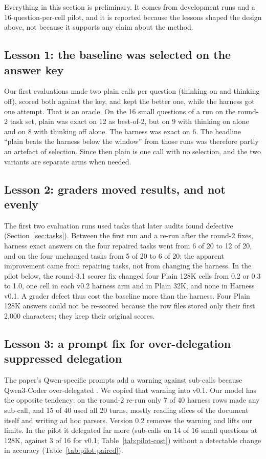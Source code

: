 \documentclass[11pt]{article}
\begin{document}
Everything in this section is preliminary. It comes from development runs and a
16-question-per-cell pilot, and it is reported because the lessons shaped the
design above, not because it supports any claim about the method.

\subsection{Lesson 1: the baseline was selected on the answer key}
Our first evaluations made two plain calls per question (thinking on and thinking
off), scored both against the key, and kept the better one, while the harness got
one attempt. That is an oracle. On the 16 small questions of a run on the round-2
task set, plain was exact on 12 as best-of-2, but on 9 with thinking on alone and on
8 with thinking off alone. The harness was exact on 6. The headline ``plain beats
the harness below the window'' from those runs was therefore partly an artefact of
selection. Since then plain is one call with no selection, and the two variants are
separate arms when needed.

\subsection{Lesson 2: graders moved results, and not evenly}
The first two evaluation runs used tasks that later audits found defective
(Section~\ref{sec:tasks}). Between the first run and a re-run after the round-2
fixes, harness exact answers on the four repaired tasks went from 6 of 20 to 12 of
20, and on the four unchanged tasks from 5 of 20 to 6 of 20: the apparent
improvement came from repairing tasks, not from changing the harness. In the pilot
below, the round-3.1 scorer fix changed four Plain 128K cells from 0.2 or 0.3 to 1.0,
one cell in each v0.2 harness arm and in Plain 32K, and none in Harness v0.1. A grader
defect thus cost the baseline more than the harness. Four Plain 128K answers could
not be re-scored because the row files stored only their first 2,000 characters;
they keep their original scores.

\subsection{Lesson 3: a prompt fix for over-delegation suppressed delegation}
The paper's Qwen-specific prompts add a warning against sub-calls because
Qwen3-Coder over-delegated \citep[App.~C]{zhang2025rlm}. We copied that warning
into v0.1. Our model has the opposite tendency: on the round-2 re-run only 7 of 40
harness rows made any sub-call, and 15 of 40 used all 20 turns, mostly reading
slices of the document itself and writing ad hoc parsers. Version 0.2 removes the
warning and lifts our limits. In the pilot it delegated far more (sub-calls on
14 of 16 small questions at 128K, against 3 of 16 for v0.1; Table~\ref{tab:pilot-cost})
without a detectable change in accuracy (Table~\ref{tab:pilot-paired}).
\end{document}
